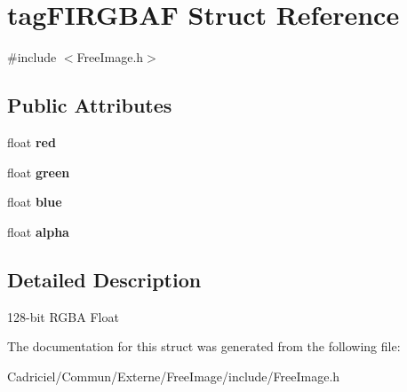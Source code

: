 \hypertarget{structtag_f_i_r_g_b_a_f}{}\section{tag\+F\+I\+R\+G\+B\+AF Struct Reference}
\label{structtag_f_i_r_g_b_a_f}


{\ttfamily \#include $<$Free\+Image.\+h$>$}

\subsection*{Public Attributes}
\begin{DoxyCompactItemize}
\item 
float {\bfseries red}\hypertarget{structtag_f_i_r_g_b_a_f_a59e5260e2f6e013661bc5d4775b18d9e}{}\label{structtag_f_i_r_g_b_a_f_a59e5260e2f6e013661bc5d4775b18d9e}

\item 
float {\bfseries green}\hypertarget{structtag_f_i_r_g_b_a_f_ac4e284e0711fdba31b624cee92d85e2b}{}\label{structtag_f_i_r_g_b_a_f_ac4e284e0711fdba31b624cee92d85e2b}

\item 
float {\bfseries blue}\hypertarget{structtag_f_i_r_g_b_a_f_a9c2e5ec45c4c33518fd4765f5fd04b01}{}\label{structtag_f_i_r_g_b_a_f_a9c2e5ec45c4c33518fd4765f5fd04b01}

\item 
float {\bfseries alpha}\hypertarget{structtag_f_i_r_g_b_a_f_a59da6fdc089e6ad1f8b2be601815f5cb}{}\label{structtag_f_i_r_g_b_a_f_a59da6fdc089e6ad1f8b2be601815f5cb}

\end{DoxyCompactItemize}


\subsection{Detailed Description}
128-\/bit R\+G\+BA Float 

The documentation for this struct was generated from the following file\+:\begin{DoxyCompactItemize}
\item 
Cadriciel/\+Commun/\+Externe/\+Free\+Image/include/Free\+Image.\+h\end{DoxyCompactItemize}
